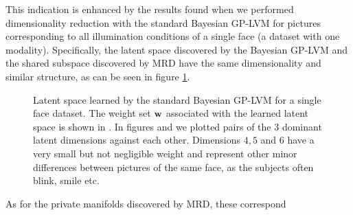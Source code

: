 %
This indication is enhanced by the results found when we performed
dimensionality reduction with the standard Bayesian GP-LVM for
pictures corresponding to all illumination conditions of a single face (\ie a dataset with one
modality).  Specifically, the latent space discovered by the Bayesian
GP-LVM and the shared subspace discovered by MRD have the same
dimensionality and similar structure, as can be seen in figure
\ref{fig:yaleOneFace1}.
%
\hspace{-6pt}
\begin{figure}[ht]
\begin{center}
\hspace{-5pt}
\hspace{-5pt}
\end{center}
\vspace{-4pt}
\caption{
Latent space learned by the standard Bayesian GP-LVM for a single face dataset.
The weight set $\mathbf{w}$ associated with the learned latent space is shown in .
In figures  and  we plotted pairs of the $3$ dominant
latent dimensions against each other. Dimensions $4,5$ and $6$ have a very small but not negligible weight and
represent other minor differences between pictures of the same face, as the subjects often blink, smile etc.
}
\label{fig:yaleOneFace1}
\end{figure}
\hspace{-6pt}
%
\par As for the private manifolds discovered by MRD, these correspond
